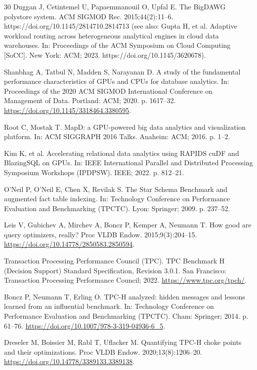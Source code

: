 \documentclass[10pt,a4paper]{article}
\begin{document}
\begin{thebibliography}{30}
Duggan J, Cetintemel U, Papaemmanouil O, Upfal E. The BigDAWG polystore system. ACM SIGMOD Rec. 2015;44(2):11--6. https://doi.org/10.1145/2814710.2814713 (see also: Gupta H, et al. Adaptive workload routing across heterogeneous analytical engines in cloud data warehouses. In: Proceedings of the ACM Symposium on Cloud Computing [SoCC]. New York: ACM; 2023. https://doi.org/10.1145/3620678).


Shanbhag A, Tatbul N, Madden S, Narayanan D. A study of the fundamental performance characteristics of GPUs and CPUs for database analytics. In: Proceedings of the 2020 ACM SIGMOD International Conference on Management of Data. Portland: ACM; 2020. p. 1617--32. \url{https://doi.org/10.1145/3318464.3380595}.

Root C, Mostak T. MapD: a GPU-powered big data analytics and visualization platform. In: ACM SIGGRAPH 2016 Talks. Anaheim: ACM; 2016. p. 1--2.

Kim K, et al. Accelerating relational data analytics using RAPIDS cuDF and BlazingSQL on GPUs. In: IEEE International Parallel and Distributed Processing Symposium Workshops (IPDPSW). IEEE; 2022. p. 812--21.

O'Neil P, O'Neil E, Chen X, Revilak S. The Star Schema Benchmark and augmented fact table indexing. In: Technology Conference on Performance Evaluation and Benchmarking (TPCTC). Lyon: Springer; 2009. p. 237--52.

Leis V, Gubichev A, Mirchev A, Boncz P, Kemper A, Neumann T. How good are query optimizers, really? Proc VLDB Endow. 2015;9(3):204--15. \url{https://doi.org/10.14778/2850583.2850594}.

Transaction Processing Performance Council (TPC). TPC Benchmark H (Decision Support) Standard Specification, Revision 3.0.1. San Francisco: Transaction Processing Performance Council; 2022. \url{https://www.tpc.org/tpch/}.

Boncz P, Neumann T, Erling O. TPC-H analyzed: hidden messages and lessons learned from an influential benchmark. In: Technology Conference on Performance Evaluation and Benchmarking (TPCTC). Cham: Springer; 2014. p. 61--76. \url{https://doi.org/10.1007/978-3-319-04936-6_5}.

Dreseler M, Boissier M, Rabl T, Uflacker M. Quantifying TPC-H choke points and their optimizations. Proc VLDB Endow. 2020;13(8):1206--20. \url{https://doi.org/10.14778/3389133.3389138}.


\end{thebibliography}
\end{document}

